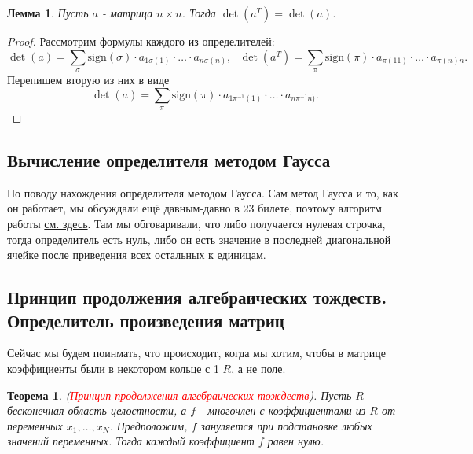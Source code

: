 \documentclass[a4paper,100pt]{article}
\theoremstyle{indented}
\newtheorem{theorem}{Теорема}
\newtheorem{lemma}{Лемма}
\theoremstyle{definition}
\theoremstyle{remark}
\begin{document}
\begin{lemma}
    Пусть $a$ - матрица $n\times n$. Тогда $\det (a^T)=\det (a)$. 
\end{lemma}

\begin{proof}
    Рассмотрим формулы каждого из определителей:
    \[
        \det (a)=\sum_{\sigma} \text{sign}(\sigma)\cdot a_{1\sigma(1)}\cdot \dots\cdot a_{n\sigma(n)}, \text{     }
        \det (a^T)=\sum_{\pi} \text{sign}(\pi)\cdot a_{\pi(1 1)}\cdot \dots\cdot a_{\pi(n) n}.
    \]
    Перепишем вторую из них в виде
    \[
        \det (a)=\sum_{\pi} \text{sign}(\pi)\cdot a_{1\pi^{-1}(1)}\cdot \dots\cdot a_{n\pi^{-1}n)}.
    \]
\end{proof}

\resetall

\subsection{Вычисление определителя методом Гаусса}

По поводу нахождения определителя методом Гаусса. Сам метод Гаусса и то, как он работает, мы обсуждали ещё давным-давно в 23 билете, поэтому алгоритм работы \hyperlink{n60}{см. здесь}. Там мы обговаривали, что либо получается нулевая строчка, тогда определитель есть нуль, либо он есть значение в последней диагональной ячейке после приведения всех остальных к единицам.

\resetall

\subsection{Принцип продолжения алгебраических тождеств. Определитель произведения матриц}

Сейчас мы будем поинмать, что происходит, когда мы хотим, чтобы в матрице коэффициенты были в некотором кольце с 1 $R$, а не поле.\\

\begin{theorem}
    (\hypertarget{n104}{\textcolor{red}{\textit{Принцип продолжения алгебраических тождеств}}}). Пусть $R$ - бесконечная область целостности, а $f$ - многочлен с коэффициентами из $R$ от переменных $x_1, \dots, x_N$. Предположим, $f$ зануляется при подстановке любых значений переменных. Тогда каждый коэффициент $f$ равен нулю.
\end{theorem}
\end{document}

